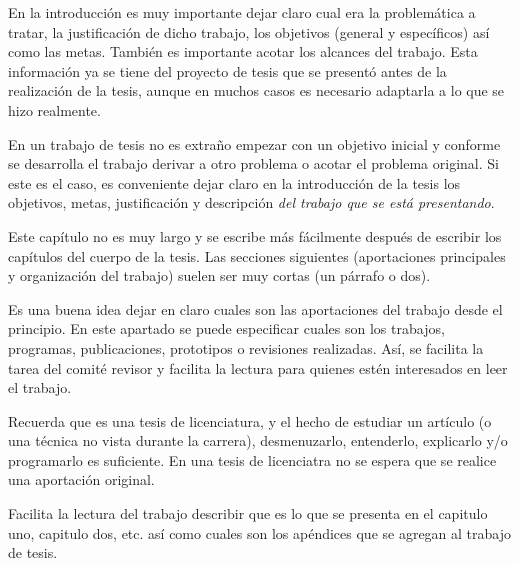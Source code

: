
En la introducción es muy importante dejar claro cual era la
problemática a tratar, la justificación de dicho trabajo, los
objetivos (general y específicos) así como las metas. También es
importante acotar los alcances del trabajo. Esta información ya se
tiene del proyecto de tesis que se presentó antes de la realización de
la tesis, aunque en muchos casos es necesario adaptarla a lo que se
hizo realmente.

En un trabajo de tesis no es extraño empezar con un objetivo inicial y
conforme se desarrolla el trabajo derivar a otro problema o acotar el
problema original. Si este es el caso, es conveniente dejar claro en
la introducción de la tesis los objetivos, metas, justificación y
descripción \emph{del trabajo que se está presentando}.

Este capítulo no es muy largo y se escribe más fácilmente después de
escribir los capítulos del cuerpo de la tesis. Las secciones
siguientes (aportaciones principales y organización del trabajo)
suelen ser muy cortas (un párrafo o dos).


Es una buena idea dejar en claro cuales son las aportaciones del
trabajo desde el principio. En este apartado se puede especificar
cuales son los trabajos, programas, publicaciones, prototipos o
revisiones realizadas. Así, se facilita la tarea del comité revisor y
facilita la lectura para quienes estén interesados en leer el trabajo.

Recuerda que es una tesis de licenciatura, y el hecho de estudiar un
artículo (o una técnica no vista durante la carrera), desmenuzarlo,
entenderlo, explicarlo y/o programarlo es suficiente. En una tesis de
licenciatra no se espera que se realice una aportación original.


Facilita la lectura del trabajo describir que es lo que se presenta en el capitulo uno,
capitulo dos, etc. así como cuales son los apéndices que se agregan
al trabajo de tesis.
